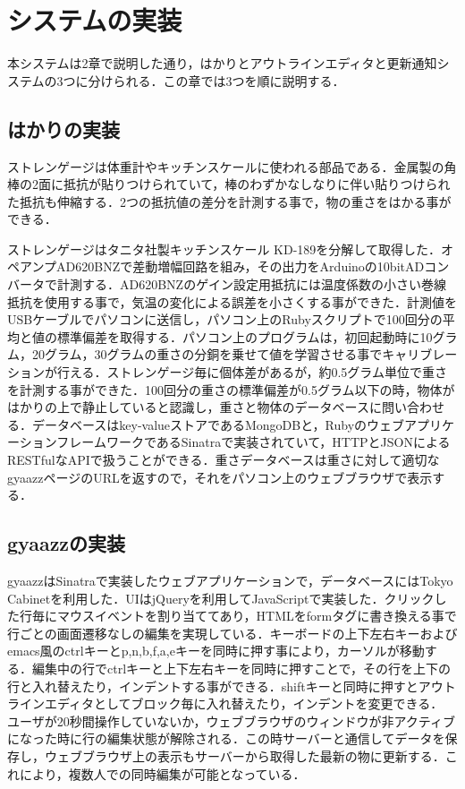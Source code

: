 \section{システムの実装}
本システムは2章で説明した通り，はかりとアウトラインエディタと更新通知システムの3つに分けられる．この章では3つを順に説明する．

\subsection{はかりの実装}
ストレンゲージは体重計やキッチンスケールに使われる部品である．金属製の角棒の2面に抵抗が貼りつけられていて，棒のわずかなしなりに伴い貼りつけられた抵抗も伸縮する．2つの抵抗値の差分を計測する事で，物の重さをはかる事ができる．

ストレンゲージはタニタ社製キッチンスケール KD-189を分解して取得した．オペアンプAD620BNZで差動増幅回路を組み，その出力をArduino\cite{arduino}の10bitADコンバータで計測する．AD620BNZのゲイン設定用抵抗には温度係数の小さい巻線抵抗を使用する事で，気温の変化による誤差を小さくする事ができた．計測値をUSBケーブルでパソコンに送信し，パソコン上のRubyスクリプトで100回分の平均と値の標準偏差を取得する．パソコン上のプログラムは，初回起動時に10グラム，20グラム，30グラムの重さの分銅を乗せて値を学習させる事でキャリブレーションが行える．ストレンゲージ毎に個体差があるが，約0.5グラム単位で重さを計測する事ができた．100回分の重さの標準偏差が0.5グラム以下の時，物体がはかりの上で静止していると認識し，重さと物体のデータベースに問い合わせる．データベースはkey-valueストアであるMongoDB\cite{mongodb}と，RubyのウェブアプリケーションフレームワークであるSinatra\cite{sinatra}で実装されていて，HTTPとJSONによるRESTfulなAPIで扱うことができる．重さデータベースは重さに対して適切なgyaazzページのURLを返すので，それをパソコン上のウェブブラウザで表示する．

\subsection{gyaazzの実装}
gyaazzはSinatraで実装したウェブアプリケーションで，データベースにはTokyo Cabinet\cite{tc}を利用した．UIはjQuery\cite{jQuery}を利用してJavaScriptで実装した．クリックした行毎にマウスイベントを割り当ててあり，HTMLをformタグに書き換える事で行ごとの画面遷移なしの編集を実現している．キーボードの上下左右キーおよびemacs風のctrlキーとp,n,b,f,a,eキーを同時に押す事により，カーソルが移動する．編集中の行でctrlキーと上下左右キーを同時に押すことで，その行を上下の行と入れ替えたり，インデントする事ができる．shiftキーと同時に押すとアウトラインエディタとしてブロック毎に入れ替えたり，インデントを変更できる．
ユーザが20秒間操作していないか，ウェブブラウザのウィンドウが非アクティブになった時に行の編集状態が解除される．この時サーバーと通信してデータを保存し，ウェブブラウザ上の表示もサーバーから取得した最新の物に更新する．これにより，複数人での同時編集が可能となっている．

